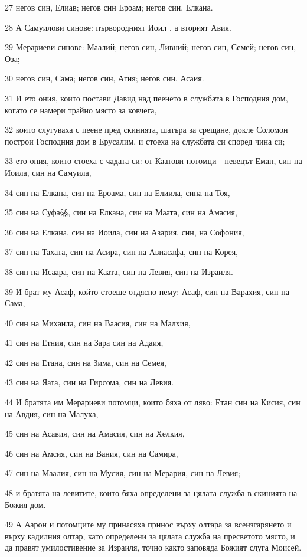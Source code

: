 \par 27 негов син, Елиав; негов син Ероам; негов син, Елкана.
\par 28 А Самуилови синове: първородният Иоил , а вторият Авия.
\par 29 Мерариеви синове: Маалий; негов син, Ливний; негов син, Семей; негов син, Оза;
\par 30 негов син, Сама; негов син, Агия; негов син, Асаия.
\par 31 И ето ония, които постави Давид над пеенето в службата в Господния дом, когато се намери трайно място за ковчега,
\par 32 които слугуваха с пеене пред скинията, шатъра за срещане, докле Соломон построи Господния дом в Ерусалим, и стоеха на службата си според чина си;
\par 33 ето ония, които стоеха с чадата си: от Каатови потомци - певецът Еман, син на Иоила, син на Самуила,
\par 34 син на Елкана, син на Ероама, син на Елиила, сина на Тоя,
\par 35 син на Суфа§§, син на Елкана, син на Маата, син на Амасия,
\par 36 син на Елкана, син на Иоила, син на Азария, син, на Софония,
\par 37 син на Тахата, син на Асира, син на Авиасафа, син на Корея,
\par 38 син на Исаара, син на Каата, син на Левия, син на Израиля.
\par 39 И брат му Асаф, който стоеше отдясно нему: Асаф, син на Варахия, син на Сама,
\par 40 син на Михаила, син на Ваасия, син на Малхия,
\par 41 син на Етния, син на Зара син на Адаия,
\par 42 син на Етана, син на Зима, син на Семея,
\par 43 син на Яата, син на Гирсома, син на Левия.
\par 44 И братята им Мерариеви потомци, които бяха от ляво: Етан син на Кисия, син на Авдия, син на Малуха,
\par 45 син на Асавия, син на Амасия, син на Хелкия,
\par 46 син на Амсия, син на Вания, син на Самира,
\par 47 син на Маалия, син на Мусия, син на Мерария, син на Левия;
\par 48 и братята на левитите, които бяха определени за цялата служба в скинията на Божия дом.
\par 49 А Аарон и потомците му принасяха принос върху олтара за всеизгарянето и върху кадилния олтар, като определени за цялата служба на пресветото място, и да правят умилостивение за Израиля, точно както заповяда Божият слуга Моисей.
